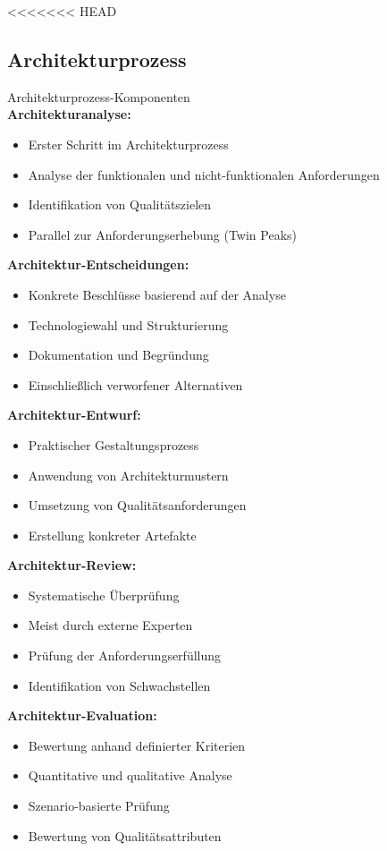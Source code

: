 <<<<<<< HEAD
\subsection{Architekturprozess}

\begin{definition}{Architekturprozess-Komponenten}\\
\textbf{Architekturanalyse:}
\begin{itemize}
    \item Erster Schritt im Architekturprozess
    \item Analyse der funktionalen und nicht-funktionalen Anforderungen
    \item Identifikation von Qualitätszielen
    \item Parallel zur Anforderungserhebung (Twin Peaks)
\end{itemize}

\textbf{Architektur-Entscheidungen:}
\begin{itemize}
    \item Konkrete Beschlüsse basierend auf der Analyse
    \item Technologiewahl und Strukturierung
    \item Dokumentation und Begründung
    \item Einschließlich verworfener Alternativen
\end{itemize}

\textbf{Architektur-Entwurf:}
\begin{itemize}
    \item Praktischer Gestaltungsprozess
    \item Anwendung von Architekturmustern
    \item Umsetzung von Qualitätsanforderungen
    \item Erstellung konkreter Artefakte
\end{itemize}

\textbf{Architektur-Review:}
\begin{itemize}
    \item Systematische Überprüfung
    \item Meist durch externe Experten
    \item Prüfung der Anforderungserfüllung
    \item Identifikation von Schwachstellen
\end{itemize}

\textbf{Architektur-Evaluation:}
\begin{itemize}
    \item Bewertung anhand definierter Kriterien
    \item Quantitative und qualitative Analyse
    \item Szenario-basierte Prüfung
    \item Bewertung von Qualitätsattributen
\end{itemize}
\end{definition}

